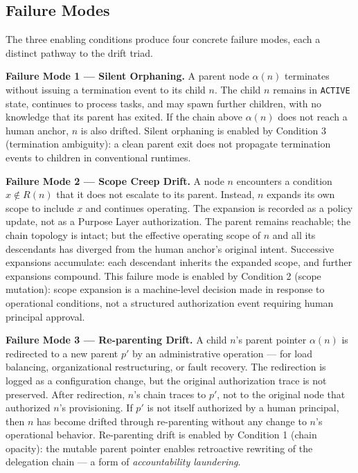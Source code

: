 \subsection{Failure Modes}
\label{sec:rs-drift-failure-modes}

The three enabling conditions produce four concrete failure modes, each a distinct pathway to the drift triad.

\medskip
\noindent\textbf{Failure Mode 1 — Silent Orphaning.}
A parent node $\alpha(n)$ terminates without issuing a termination event to its child $n$. The child $n$ remains in \texttt{ACTIVE} state, continues to process tasks, and may spawn further children, with no knowledge that its parent has exited. If the chain above $\alpha(n)$ does not reach a human anchor, $n$ is also drifted. Silent orphaning is enabled by Condition 3 (termination ambiguity): a clean parent exit does not propagate termination events to children in conventional runtimes.

\medskip
\noindent\textbf{Failure Mode 2 — Scope Creep Drift.}
A node $n$ encounters a condition $x \notin R(n)$ that it does not escalate to its parent. Instead, $n$ expands its own scope to include $x$ and continues operating. The expansion is recorded as a policy update, not as a Purpose Layer authorization. The parent remains reachable; the chain topology is intact; but the effective operating scope of $n$ and all its descendants has diverged from the human anchor's original intent. Successive expansions accumulate: each descendant inherits the expanded scope, and further expansions compound. This failure mode is enabled by Condition 2 (scope mutation): scope expansion is a machine-level decision made in response to operational conditions, not a structured authorization event requiring human principal approval.

\medskip
\noindent\textbf{Failure Mode 3 — Re-parenting Drift.}
A child $n$'s parent pointer $\alpha(n)$ is redirected to a new parent $p'$ by an administrative operation — for load balancing, organizational restructuring, or fault recovery. The redirection is logged as a configuration change, but the original authorization trace is not preserved. After redirection, $n$'s chain traces to $p'$, not to the original node that authorized $n$'s provisioning. If $p'$ is not itself authorized by a human principal, then $n$ has become drifted through re-parenting without any change to $n$'s operational behavior. Re-parenting drift is enabled by Condition 1 (chain opacity): the mutable parent pointer enables retroactive rewriting of the delegation chain — a form of \emph{accountability laundering}.

